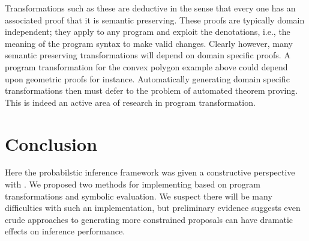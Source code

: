 Transformations such as these are deductive in the sense that every one has an associated proof that it is semantic preserving.
These proofs are typically domain independent; they apply to any program and exploit the denotations, i.e., the meaning of the program syntax to make valid changes.
Clearly however, many semantic preserving transformations will depend on domain specific proofs.
A program transformation for the convex polygon example above could depend upon geometric proofs for instance.
Automatically generating domain specific transformations then must defer to the problem of automated theorem proving.
This is indeed an active area of research in program transformation.










\section{Conclusion}
Here the probabilstic inference framework  was given a constructive perspective with .
We proposed two methods for implementing  based on program transformations and symbolic evaluation.
We suspect there will be many difficulties with such an implementation, but preliminary evidence suggests even crude approaches to generating more constrained proposals can have dramatic effects on inference performance.

